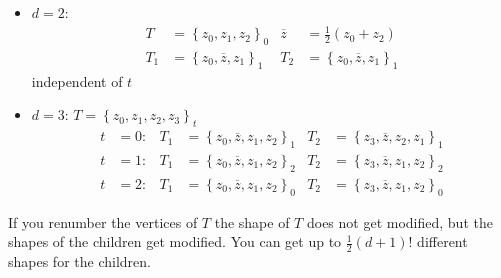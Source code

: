 \begin{example}
	\begin{itemize}
		\item $d=2$:\\
			\begin{align*}
				T &= \left\{ z_{0},z_{1},z_{2} \right\}_{0} & \overline{z}&= \frac{1}{2}\left(z_{0} + z_{2} \right)\\
				T_{1} &= \left\{ z_{0},\overline{z},z_{1} \right\}_{1}  & T_{2} &= \left\{ z_{0},\overline{z},z_{1} \right\}_{1}
			\end{align*}
			independent of $t$
			
		\item $d= 3$: \quad $T = \left\{ z_{0},z_{1},z_{2},z_{3} \right\}_{t}$
			\begin{align*}
				t&=0: & T_{1}&= \left\{ z_{0},\overline{z}, z_{1},z_{2} \right\}_{1} & T_{2}&= \left\{ z_{3},\overline{z}, z_{2},z_{1} \right\}_{1}\\
				t&=1: & T_{1}&= \left\{ z_{0},\overline{z}, z_{1},z_{2} \right\}_{2} & T_{2}&= \left\{ z_{3},\overline{z}, z_{1},z_{2} \right\}_{2}\\
				t&=2: & T_{1}&= \left\{ z_{0},\overline{z}, z_{1},z_{2} \right\}_{0} & T_{2}&= \left\{ z_{3},\overline{z}, z_{1},z_{2} \right\}_{0}
			\end{align*}
	\end{itemize}
\end{example}
If you renumber the vertices of $T$ the shape of $T$ does not get modified, but the shapes of the children get modified. You can get up to $\frac{1}{2}\left(d+1 \right)!$ different shapes for the children.

